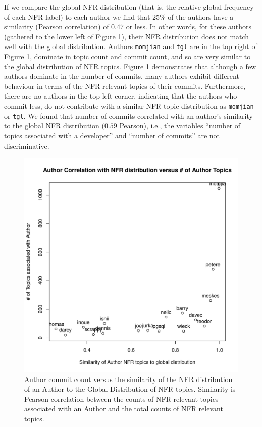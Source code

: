 \documentclass[smallextended]{svjour3}       %
\begin{document}
If we compare the global NFR distribution (that is, the relative global frequency of each NFR label)
to each author we find that 25\%
 of the authors have a similarity (Pearson correlation) of $0.47$ or less. In other words, for these authors (gathered to the lower left of Figure  \ref{fig:authorsim}),
 their NFR distribution does not match well with the global
 distribution.
Authors \texttt{momjian} and \texttt{tgl} are in the top right of
Figure \ref{fig:authorsim}, dominate in topic count and commit count, and so are
    very similar to the global distribution of NFR topics.
Figure \ref{fig:authorsim} demonstrates that although a  few authors dominate in
the number of commits, many authors exhibit different behaviour in
terms of the NFR-relevant topics of their commits. Furthermore, there
are no authors in the top left corner, indicating that the authors who
commit less, do not contribute with a similar NFR-topic distribution
as \texttt{momjian} or \texttt{tgl}.
We found that number of commits correlated with an author's similarity to the
global NFR distribution ($0.59$ Pearson), i.e., the variables ``number of topics associated with a developer'' and ``number of commits'' are not discriminative.


\begin{figure}
  \centering
  \includegraphics[width=.9\textwidth]{figures/author-distance-from-aggregate}
  \caption{Author commit count versus the similarity of the NFR
    distribution of an Author to the Global Distribution of NFR
    topics. Similarity is Pearson correlation between the counts of
    NFR relevant topics associated with an Author and the total counts
    of NFR relevant topics. }
\label{fig:authorsim}
\end{figure}
\end{document}

